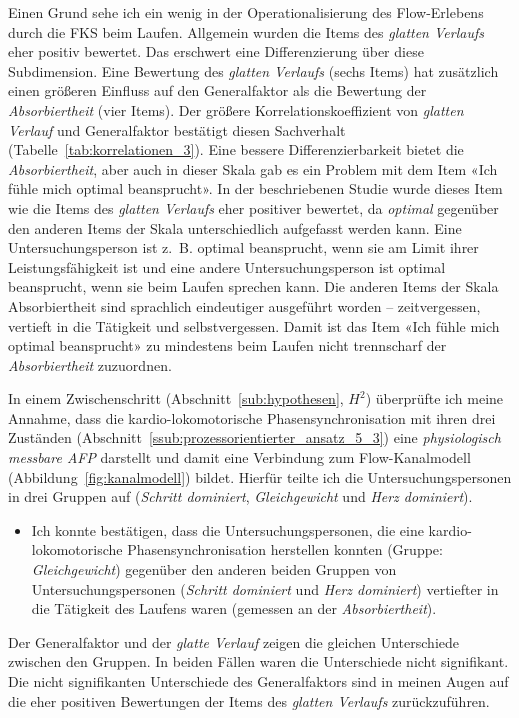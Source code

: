 Einen Grund sehe ich ein wenig in der Operationalisierung des Flow-Erlebens durch die \ac{FKS} beim Laufen. Allgemein wurden die Items des \emph{glatten Verlaufs} eher positiv bewertet. Das erschwert eine Differenzierung über diese Subdimension. Eine Bewertung des \emph{glatten Verlaufs} (sechs Items) hat zusätzlich einen größeren Einfluss auf den Generalfaktor als die Bewertung der \emph{Absorbiertheit} (vier Items). Der größere Korrelationskoeffizient von \emph{glatten Verlauf} und Generalfaktor bestätigt diesen Sachverhalt (Tabelle~\ref{tab:korrelationen_3}). Eine bessere Differenzierbarkeit bietet die \emph{Absorbiertheit}, aber auch in dieser Skala gab es ein Problem mit dem Item «Ich fühle mich optimal beansprucht». In der beschriebenen Studie wurde dieses Item wie die Items des \emph{glatten Verlaufs} eher positiver bewertet, da \emph{optimal} gegenüber den anderen Items der Skala unterschiedlich aufgefasst werden kann. Eine Untersuchungsperson ist z.~B. optimal beansprucht, wenn sie am Limit ihrer Leistungsfähigkeit ist und eine andere Untersuchungsperson ist optimal beansprucht, wenn sie beim Laufen sprechen kann. Die anderen Items der Skala Absorbiertheit sind sprachlich eindeutiger ausgeführt worden -- zeitvergessen, vertieft in die Tätigkeit und selbstvergessen. Damit ist das Item «Ich fühle mich optimal beansprucht» zu mindestens beim Laufen nicht trennscharf der \emph{Absorbiertheit} zuzuordnen. 

In einem Zwischenschritt (Abschnitt~\ref{sub:hypothesen}, $H^2$) überprüfte ich meine Annahme, dass die kardio-lokomotorische Phasensynchronisation mit ihren drei Zuständen (Abschnitt~\ref{ssub:prozessorientierter_ansatz_5_3}) eine \emph{physiologisch messbare \ac{AFP}} darstellt und damit eine Verbindung zum Flow-Kanalmodell (Abbildung~\ref{fig:kanalmodell}) bildet. Hierfür teilte ich die Untersuchungspersonen in drei Gruppen auf (\emph{Schritt dominiert}, \emph{Gleichgewicht} und \emph{Herz dominiert}).
\begin{itemize}
	
	\item Ich konnte bestätigen, dass die Untersuchungspersonen, die eine kardio-lokomotorische Phasensynchronisation herstellen konnten (Gruppe: \emph{Gleichgewicht}) gegenüber den anderen beiden Gruppen von Untersuchungspersonen (\emph{Schritt dominiert} und \emph{Herz dominiert}) vertiefter in die Tätigkeit des Laufens waren (gemessen an der \emph{Absorbiertheit}).
\end{itemize}

Der Generalfaktor und der \emph{glatte Verlauf} zeigen die gleichen Unterschiede zwischen den Gruppen. In beiden Fällen waren die Unterschiede nicht signifikant. Die nicht signifikanten Unterschiede des Generalfaktors sind in meinen Augen auf die eher positiven Bewertungen der Items des \emph{glatten Verlaufs} zurückzuführen. 


